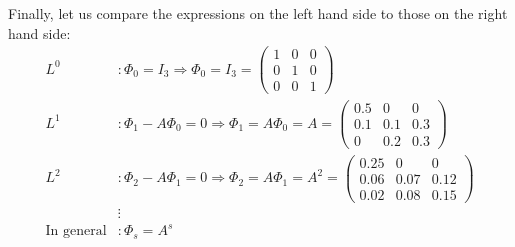 \begin{enumerate}
\begin{sol}
              Finally, let us compare the expressions on the left hand side to those on the right hand side:
              \begin{align}
                  L^0
                                    & : \Phi_0 = I_3
                  \Rightarrow
                  \Phi_0 = I_3
                  = \begin{pmatrix}
                        1 & 0 & 0 \\ 0 & 1 & 0 \\ 0 & 0 & 1
                    \end{pmatrix}
                  \nonumber                                       \\
                  L^1
                                    & : \Phi_1 - A \Phi_0 = 0
                  \Rightarrow
                  \Phi_1 = A \Phi_0
                  = A
                  = \begin{pmatrix}
                        0.5 & 0 & 0 \\ 0.1 & 0.1 & 0.3 \\ 0 & 0.2 & 0.3
                    \end{pmatrix}
                  \nonumber                                       \\
                  L^2
                                    & : \Phi_2 - A \Phi_1 = 0
                  \Rightarrow
                  \Phi_2 = A \Phi_1
                  = A^2
                  = \begin{pmatrix}
                        0.25 & 0 & 0 \\ 0.06 & 0.07 & 0.12 \\ 0.02 & 0.08 & 0.15
                    \end{pmatrix}
                  \nonumber                                       \\
                                    & \vdots
                  \nonumber                                       \\
                  \text{In general} & : \Phi_s = A^s \label{allg}
              \end{align}
          \end{sol}
\end{enumerate}